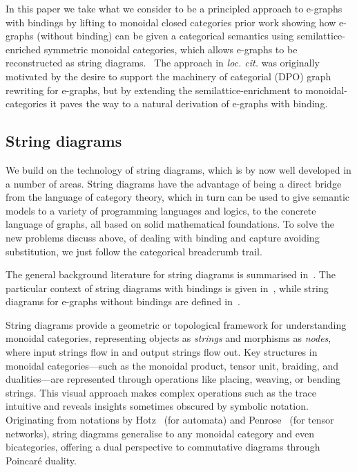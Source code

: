 \documentclass[peerreviewcls]{IEEEtran}
\begin{document}
In this paper we take what we consider to be a principled approach to e-graphs with bindings by lifting to monoidal closed categories prior work showing how e-graphs (without binding) can be given a categorical semantics using semilattice-enriched symmetric monoidal categories, which allows e-graphs to be reconstructed as string diagrams.~\cite{ghica2024equivalencehypergraphsegraphsmonoidal}
The approach in \emph{loc. cit.} was originally motivated by the desire to support the machinery of categorial (DPO) graph rewriting for e-graphs, but by extending the semilattice-enrichment to monoidal-categories it paves the way to a natural derivation of e-graphs with binding.

\subsection{String diagrams}

We build on the technology of string diagrams, which is by now well developed in a number of areas. 
String diagrams have the advantage of being a direct bridge from the language of category theory, which in turn can be used to give semantic models to a variety of programming languages and logics, to the concrete language of graphs, all based on solid mathematical foundations. 
To solve the new problems discuss above, of dealing with binding and capture avoiding substitution, we just follow the categorical breadcrumb trail. 

The general background literature for string diagrams is summarised in~\cite{https://arxiv.org/abs/2305.08768}.
The particular context of string diagrams with bindings is given in~\cite{https://arxiv.org/abs/2305.18945}, while string diagrams for e-graphs without bindings are defined in~\cite{https://arxiv.org/abs/2406.15882}.

String diagrams provide a geometric or topological framework for understanding monoidal categories, representing objects as \emph{strings} and morphisms as \emph{nodes}, where input strings flow in and output strings flow out. 
Key structures in monoidal categories---such as the monoidal product, tensor unit, braiding, and dualities---are represented through operations like placing, weaving, or bending strings. 
This visual approach makes complex operations such as the trace intuitive and reveals insights sometimes obscured by symbolic notation. 
Originating from notations by Hotz~\cite{??} (for automata) and Penrose~\cite{??} (for tensor networks), string diagrams generalise to any monoidal category and even bicategories, offering a dual perspective to commutative diagrams through Poincaré duality. 
\end{document}
